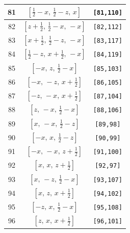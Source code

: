 \documentclass[fleqn,8pt]{jsarticle}
\begin{document}
\begin{longtable}{ccc}
81 & $\left[ \frac{1}{2} - x,\, \frac{1}{2} - z,\, x \right]$ & {\tt [81,110]} \\ \hline
82 & $\left[ z + \frac{1}{2},\, \frac{1}{2} - x,\, - x \right]$ & {\tt [82,112]} \\ \hline
83 & $\left[ x + \frac{1}{2},\, \frac{1}{2} - z,\, - x \right]$ & {\tt [83,117]} \\ \hline
84 & $\left[ \frac{1}{2} - z,\, x + \frac{1}{2},\, - x \right]$ & {\tt [84,119]} \\ \hline
85 & $\left[ - x,\, z,\, \frac{1}{2} - x \right]$ & {\tt [85,103]} \\ \hline
86 & $\left[ - x,\, - z,\, x + \frac{1}{2} \right]$ & {\tt [86,105]} \\ \hline
87 & $\left[ - z,\, - x,\, x + \frac{1}{2} \right]$ & {\tt [87,104]} \\ \hline
88 & $\left[ z,\, - x,\, \frac{1}{2} - x \right]$ & {\tt [88,106]} \\ \hline
89 & $\left[ x,\, - x,\, \frac{1}{2} - z \right]$ & {\tt [89,98]} \\ \hline
90 & $\left[ - x,\, x,\, \frac{1}{2} - z \right]$ & {\tt [90,99]} \\ \hline
91 & $\left[ - x,\, - x,\, z + \frac{1}{2} \right]$ & {\tt [91,100]} \\ \hline
92 & $\left[ x,\, x,\, z + \frac{1}{2} \right]$ & {\tt [92,97]} \\ \hline
93 & $\left[ x,\, - z,\, \frac{1}{2} - x \right]$ & {\tt [93,107]} \\ \hline
94 & $\left[ x,\, z,\, x + \frac{1}{2} \right]$ & {\tt [94,102]} \\ \hline
95 & $\left[ - z,\, x,\, \frac{1}{2} - x \right]$ & {\tt [95,108]} \\ \hline
96 & $\left[ z,\, x,\, x + \frac{1}{2} \right]$ & {\tt [96,101]} \\
\end{longtable}
\renewcommand{\arraystretch}{1.2}
\end{document}
